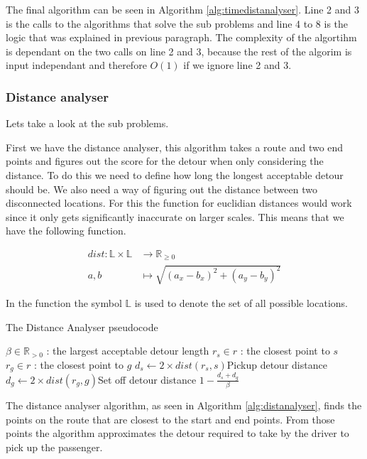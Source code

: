 The final algorithm can be seen in Algorithm \ref{alg:timedistanalyser}.
Line 2 and 3 is the calls to the algorithms that solve the sub problems and line 4 to 8 is the logic that was explained in previous paragraph.
The complexity of the algortihm is dependant on the two calls on line 2 and 3, because the rest of the algorim is input independant and therefore $O(1)$ if we ignore line 2 and 3.

\subsubsection{Distance analyser}

Lets take a look at the sub problems.

First we have the distance analyser, this algorithm takes a route and two end points and figures out the score for the detour when only considering the distance.
To do this we need to define how long the longest acceptable detour should be.
We also need a way of figuring out the distance between two disconnected locations. 
For this the function for euclidian distances would work since it only gets significantly inaccurate on larger scales.
This means that we have the following function.

\begin{align*}
	dist : \mathbb{L}\times\mathbb{L} &\rightarrow \mathbb{R}_{\geq 0}\\
	a, b &\mapsto \sqrt{(a_x - b_x)^2 + (a_y - b_y)^2}
\end{align*}

In the function the symbol $\mathbb{L}$ is used to denote the set of all possible locations.


\begin{algorithm}
	\caption{The Distance Analyser pseudocode}
	\label{alg:distanalyser}
	\begin{algorithmic}[1]
		\Require 
		\Statex $\beta \in \mathbb{R}_{>0}$ : the largest acceptable detour length
		\Statex 
			\State $r_s \in r$ : the closest point to $s$
			\State $r_g \in r$ : the closest point to $g$
			\State $d_s\gets 2\times dist(r_s, s)$\Comment Pickup detour distance
			\State $d_g\gets 2\times dist(r_g, g)$\Comment Set off detour distance
			\State\Return $1-\frac{d_s + d_g}{\beta}$
		\EndFunction
	\end{algorithmic}
\end{algorithm}

The distance analyser algorithm, as seen in Algorithm \ref{alg:distanalyser}, finds the points on the route that are closest to the start and end points.
From those points the algorithm approximates the detour required to take by the driver to pick up the passenger.


